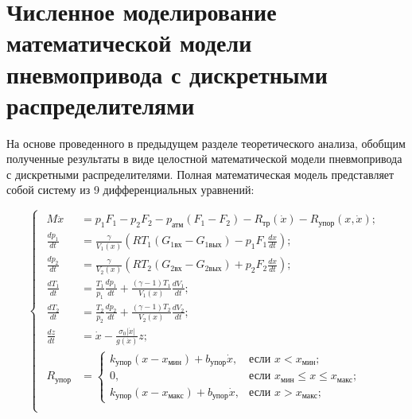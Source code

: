 \section{Численное моделирование математической модели пневмопривода с дискретными распределителями}

На основе проведенного в предыдущем разделе теоретического анализа, обобщим полученные
результаты в виде целостной математической модели пневмопривода с дискретными распределителями.
Полная математическая модель представляет собой систему из 9 дифференциальных уравнений:

\begin{equation}
	\begin{cases}
		\begin{aligned}
			M\ddot{x}                    & = p_1F_1 - p_2F_2 - p_\text{атм}(F_1 - F_2) - R_\text{тр}(\dot{x}) - R_\text{упор}(x,\dot{x});                   \\
			\frac{dp_1}{dt}              & = \frac{\gamma}{V_1(x)}\left(RT_1(G_{1\text{вх}} - G_{1\text{вых}}) - p_1 F_1\frac{dx}{dt}\right);               \\
			\frac{dp_2}{dt}              & = \frac{\gamma}{V_2(x)}\left(RT_2(G_{2\text{вх}} - G_{2\text{вых}}) + p_2 F_2\frac{dx}{dt}\right);               \\
			\frac{dT_1}{dt}              & = \frac{T_1}{p_1}\frac{dp_1}{dt} + \frac{(\gamma-1)T_1}{V_1(x)}\frac{dV_1}{dt};                                  \\
			\frac{dT_2}{dt}              & = \frac{T_2}{p_2}\frac{dp_2}{dt} + \frac{(\gamma-1)T_2}{V_2(x)}\frac{dV_2}{dt};                                  \\
			\frac{dz}{dt}                & = \dot{x} - \frac{\sigma_0|\dot{x}|}{g(\dot{x})}z;                                                               \\
			R_\text{упор}                & = \begin{cases}
				                                 k_\text{упор}(x - x_\text{мин}) + b_\text{упор}\dot{x},  & \text{если } x < x_\text{мин} ;                      \\
				                                 0,                                                       & \text{если } x_\text{мин} \leq x \leq x_\text{макс}; \\
				                                 k_\text{упор}(x - x_\text{макс}) + b_\text{упор}\dot{x}, & \text{если } x > x_\text{макс};
			                                 \end{cases} \\

\end{aligned}
\end{cases}
\end{equation}
